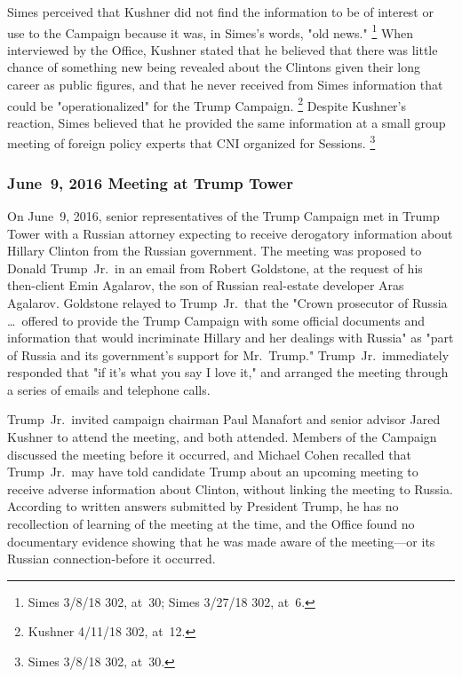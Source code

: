 Simes perceived that Kushner did not find the information to be of interest or use to the Campaign because it was, in Simes's words, "old news."%
\footnote{Simes 3/8/18 302, at~30;
Simes 3/27/18 302, at~6.}
When interviewed by the Office, Kushner stated that he believed that there was little chance of something new being revealed about the Clintons given their long career as public figures, and that he never received from Simes information that could be "operationalized" for the Trump Campaign.%
\footnote{Kushner 4/11/18 302, at~12.}
Despite Kushner's reaction, Simes believed that he provided the same information at a small group meeting of foreign policy experts that CNI organized for Sessions.%
\footnote{Simes 3/8/18 302, at~30.}

\subsubsection{June~9, 2016 Meeting at Trump Tower}

On June~9, 2016, senior representatives of the Trump Campaign met in Trump Tower with a Russian attorney expecting to receive derogatory information about Hillary Clinton from the Russian government.
The meeting was proposed to Donald Trump~Jr.\ in an email from Robert Goldstone, at the request of his then-client Emin Agalarov, the son of Russian real-estate developer Aras Agalarov.
Goldstone relayed to Trump~Jr.\ that the "Crown prosecutor of Russia \dots\ offered to provide the Trump Campaign with some official documents and information that would incriminate Hillary and her dealings with Russia" as "part of Russia and its government's support for Mr.~Trump."
Trump~Jr.\ immediately responded that "if it's what you say I love it," and arranged the meeting through a series of emails and telephone calls.

Trump~Jr.\ invited campaign chairman Paul Manafort and senior advisor Jared Kushner to attend the meeting, and both attended.
Members of the Campaign discussed the meeting before it occurred, and Michael Cohen recalled that Trump~Jr.\ may have told candidate Trump about an upcoming meeting to receive adverse information about Clinton, without linking the meeting to Russia.
According to written answers submitted by President Trump, he has no recollection of learning of the meeting at the time, and the Office found no documentary evidence showing that he was made aware of the meeting---or its Russian connection-before it occurred.

